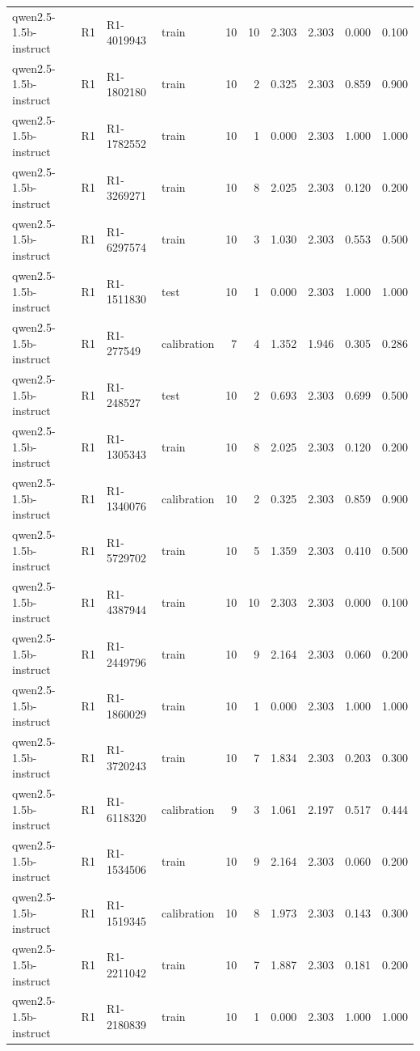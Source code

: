 \begin{table}
\begin{tabular}{llllrrrrrr}
qwen2.5-1.5b-instruct & R1 & R1-4019943 & train & 10 & 10 & 2.303 & 2.303 & 0.000 & 0.100 \\
qwen2.5-1.5b-instruct & R1 & R1-1802180 & train & 10 & 2 & 0.325 & 2.303 & 0.859 & 0.900 \\
qwen2.5-1.5b-instruct & R1 & R1-1782552 & train & 10 & 1 & 0.000 & 2.303 & 1.000 & 1.000 \\
qwen2.5-1.5b-instruct & R1 & R1-3269271 & train & 10 & 8 & 2.025 & 2.303 & 0.120 & 0.200 \\
qwen2.5-1.5b-instruct & R1 & R1-6297574 & train & 10 & 3 & 1.030 & 2.303 & 0.553 & 0.500 \\
qwen2.5-1.5b-instruct & R1 & R1-1511830 & test & 10 & 1 & 0.000 & 2.303 & 1.000 & 1.000 \\
qwen2.5-1.5b-instruct & R1 & R1-277549 & calibration & 7 & 4 & 1.352 & 1.946 & 0.305 & 0.286 \\
qwen2.5-1.5b-instruct & R1 & R1-248527 & test & 10 & 2 & 0.693 & 2.303 & 0.699 & 0.500 \\
qwen2.5-1.5b-instruct & R1 & R1-1305343 & train & 10 & 8 & 2.025 & 2.303 & 0.120 & 0.200 \\
qwen2.5-1.5b-instruct & R1 & R1-1340076 & calibration & 10 & 2 & 0.325 & 2.303 & 0.859 & 0.900 \\
qwen2.5-1.5b-instruct & R1 & R1-5729702 & train & 10 & 5 & 1.359 & 2.303 & 0.410 & 0.500 \\
qwen2.5-1.5b-instruct & R1 & R1-4387944 & train & 10 & 10 & 2.303 & 2.303 & 0.000 & 0.100 \\
qwen2.5-1.5b-instruct & R1 & R1-2449796 & train & 10 & 9 & 2.164 & 2.303 & 0.060 & 0.200 \\
qwen2.5-1.5b-instruct & R1 & R1-1860029 & train & 10 & 1 & 0.000 & 2.303 & 1.000 & 1.000 \\
qwen2.5-1.5b-instruct & R1 & R1-3720243 & train & 10 & 7 & 1.834 & 2.303 & 0.203 & 0.300 \\
qwen2.5-1.5b-instruct & R1 & R1-6118320 & calibration & 9 & 3 & 1.061 & 2.197 & 0.517 & 0.444 \\
qwen2.5-1.5b-instruct & R1 & R1-1534506 & train & 10 & 9 & 2.164 & 2.303 & 0.060 & 0.200 \\
qwen2.5-1.5b-instruct & R1 & R1-1519345 & calibration & 10 & 8 & 1.973 & 2.303 & 0.143 & 0.300 \\
qwen2.5-1.5b-instruct & R1 & R1-2211042 & train & 10 & 7 & 1.887 & 2.303 & 0.181 & 0.200 \\
qwen2.5-1.5b-instruct & R1 & R1-2180839 & train & 10 & 1 & 0.000 & 2.303 & 1.000 & 1.000 \\

\end{tabular}
\end{table}
